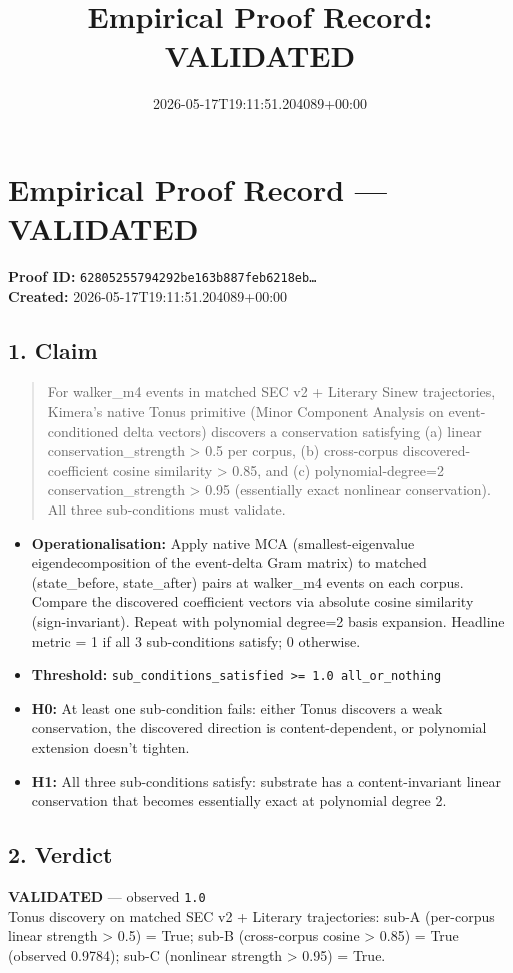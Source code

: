 \documentclass{article}
\title{Empirical Proof Record: VALIDATED}
\date{2026-05-17T19:11:51.204089+00:00}
\begin{document}
\maketitle
\section*{Empirical Proof Record --- \textcolor{validated}{\textbf{VALIDATED}}}
\textbf{Proof ID:} \texttt{62805255794292be163b887feb6218eb\dots}\\
\textbf{Created:} 2026-05-17T19:11:51.204089+00:00
\subsection*{1. Claim}
\begin{quote}For walker\_m4 events in matched SEC v2 + Literary Sinew trajectories, Kimera's native Tonus primitive (Minor Component Analysis on event-conditioned delta vectors) discovers a conservation satisfying (a) linear conservation\_strength > 0.5 per corpus, (b) cross-corpus discovered-coefficient cosine similarity > 0.85, and (c) polynomial-degree=2 conservation\_strength > 0.95 (essentially exact nonlinear conservation). All three sub-conditions must validate.\end{quote}
\begin{itemize}
\item \textbf{Operationalisation:} Apply native MCA (smallest-eigenvalue eigendecomposition of the event-delta Gram matrix) to matched (state\_before, state\_after) pairs at walker\_m4 events on each corpus. Compare the discovered coefficient vectors via absolute cosine similarity (sign-invariant). Repeat with polynomial degree=2 basis expansion. Headline metric = 1 if all 3 sub-conditions satisfy; 0 otherwise.
\item \textbf{Threshold:} \texttt{sub\_conditions\_satisfied >= 1.0 all\_or\_nothing}
\item \textbf{H0:} At least one sub-condition fails: either Tonus discovers a weak conservation, the discovered direction is content-dependent, or polynomial extension doesn't tighten.
\item \textbf{H1:} All three sub-conditions satisfy: substrate has a content-invariant linear conservation that becomes essentially exact at polynomial degree 2.
\end{itemize}
\subsection*{2. Verdict}
\textcolor{validated}{\textbf{VALIDATED}} --- observed \texttt{1.0}\\
Tonus discovery on matched SEC v2 + Literary trajectories: sub-A (per-corpus linear strength > 0.5) = True; sub-B (cross-corpus cosine > 0.85) = True (observed 0.9784); sub-C (nonlinear strength > 0.95) = True.
\end{document}
